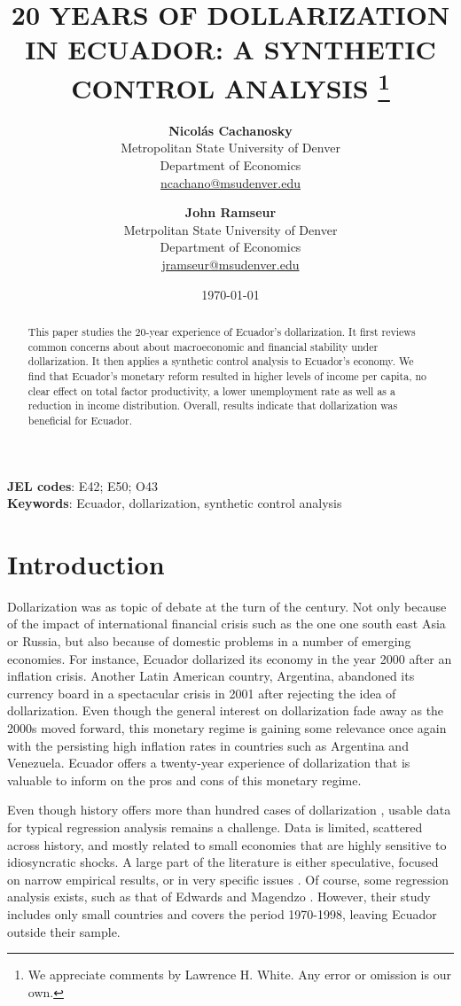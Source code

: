 \documentclass[12pt]{article}
\title{20 YEARS OF DOLLARIZATION IN ECUADOR: A SYNTHETIC CONTROL ANALYSIS
       \thanks{We appreciate comments by Lawrence H. White. Any error or omission is our own.} \\
       \bigskip}
\author{
        \textbf{Nicolás Cachanosky} \\
        Metropolitan State University of Denver \\
        Department of Economics \\
        \href{mailto:ncachano@msudenver.edu}{ncachano@msudenver.edu} \\
        \and
        \textbf{John Ramseur} \\
        Metrpolitan State University of Denver \\
        Department of Economics \\
        \href{mailto:jramseur@msudenver.edu}{jramseur@msudenver.edu} \\
        \bigskip}
\date{\today}
\begin{document}

\maketitle

\begin{abstract}
\noindent
This paper studies the 20-year experience of Ecuador's dollarization. It first reviews common concerns about about macroeconomic and financial stability under dollarization. It then applies a synthetic control analysis to Ecuador's economy. We find that Ecuador's monetary reform resulted in higher levels of income per capita, no clear effect on total factor productivity, a lower unemployment rate as well as a reduction in income distribution. Overall, results indicate that dollarization was beneficial for Ecuador.
\end{abstract}

\bigskip \bigskip
\footnotesize \noindent \textbf{JEL codes}: E42; E50; O43 \\
\footnotesize \noindent \textbf{Keywords}: Ecuador, dollarization, synthetic control analysis

\newpage
\doublespacing


\section{Introduction} 
    \label{sec:intro}

Dollarization was as topic of debate at the turn of the century. Not only because of the impact of international financial crisis such as the one one south east Asia or Russia, but also because of domestic problems in a number of emerging economies. For instance, Ecuador dollarized its economy in the year 2000 after an inflation crisis. Another Latin American country, Argentina, abandoned its currency board in a spectacular crisis in 2001 after rejecting the idea of dollarization. Even though the general interest on dollarization fade away as the 2000s moved forward, this monetary regime is gaining some relevance once again with the persisting high inflation rates in countries such as Argentina and Venezuela. Ecuador offers a twenty-year experience of dollarization that is valuable to inform on the pros and cons of this monetary regime.

Even though history offers more than hundred cases of dollarization \parencite{Schuler2005}, usable data for typical regression analysis remains a challenge. Data is limited, scattered across history, and mostly related to small economies that are highly sensitive to idiosyncratic shocks. A large part of the literature is either speculative, focused on narrow empirical results, or in very specific issues \parencite[for a sample see][]{Levy-Yeyati2002,Salvatore2003}. Of course, some regression analysis exists, such as that of Edwards and Magendzo \parencite{Edwards2006}. However, their study includes only small countries and covers the period 1970-1998, leaving Ecuador outside their sample. 
\end{document}
